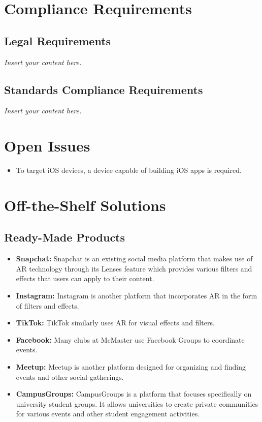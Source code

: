 \documentclass[12pt]{article}
\newcommand{\lips}{\textit{Insert your content here.}}
\begin{document}
\section{Compliance Requirements}
\subsection{Legal Requirements}
\lips
\subsection{Standards Compliance Requirements}
\lips

\section{Open Issues}
\begin{itemize}
  \item To target iOS devices, a device capable of building iOS apps is required.
\end{itemize}

\section{Off-the-Shelf Solutions}
\subsection{Ready-Made Products}
\begin{itemize}
  \item \textbf{Snapchat:} Snapchat is an existing social media platform that makes use of AR technology through its Lenses feature which provides various filters and effects that users can apply to their content.
  \item \textbf{Instagram:} Instagram is another platform that incorporates AR in the form of filters and effects.
  \item \textbf{TikTok:} TikTok similarly uses AR for visual effects and filters.
  \item \textbf{Facebook:} Many clubs at McMaster use Facebook Groups to coordinate events.
  \item \textbf{Meetup:} Meetup is another platform designed for organizing and finding events and other social gatherings.
  \item \textbf{CampusGroups:} CampusGroups is a platform that focuses specifically on university student groups. It allows universities to create private communities for various events and other student engagement activities.
\end{itemize}
\end{document}
